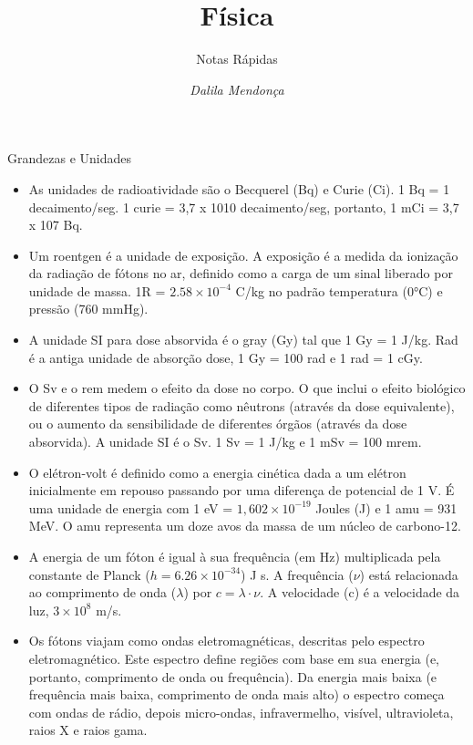 \documentclass[11pt,a4paper]{article}
\title{Física}
\author{Notas Rápidas\nocite{*}}
\date{\textit{Dalila Mendonça}}
\newcounter{exemplo}
\begin{document}
	\maketitle




\begin{exemplo}

    \textcolor{CarnationPink}{Grandezas e Unidades}

    \begin{itemize}
        \item As unidades de radioatividade são o Becquerel (Bq) e Curie (Ci). 1 Bq = 1 decaimento/seg. 1 curie = 3,7 x 1010 decaimento/seg, portanto, 1 mCi = 3,7 x 107 Bq.
        
        \item Um roentgen é a unidade de exposição. A exposição é a medida da ionização da radiação de fótons no ar, definido como a carga de um sinal liberado por unidade de massa. 1R = $2.58 \times 10^{-4}$ C/kg no padrão temperatura (\ang{0}C) e pressão (760 mmHg).
        
        \item A unidade SI para dose absorvida é o gray (Gy) tal que 1 Gy = 1 J/kg. Rad é a antiga unidade de absorção
        dose, 1 Gy = 100 rad e 1 rad = 1 cGy.

        \item O Sv e o rem medem o efeito da dose no corpo. O que inclui o efeito biológico de diferentes tipos
        de radiação como nêutrons (através da dose equivalente), ou o aumento da sensibilidade de diferentes órgãos (através da dose absorvida). A unidade SI é o Sv. 1 Sv = 1 J/kg e 1 mSv = 100 mrem.

        \item O elétron-volt é definido como a energia cinética dada a um elétron inicialmente em repouso passando por
        uma diferença de potencial de 1 V. É uma unidade de energia com 1 eV = $1,602 \times 10^{-19}$ Joules (J) e
        1 amu = 931 MeV. O amu representa um doze avos da massa de um núcleo de carbono-12.

        \item A energia de um fóton é igual à sua frequência (em Hz) multiplicada pela constante de Planck ($h = 6.26 \times 10^{-34} $) J s. A frequência ($\nu$) está relacionada ao comprimento de onda ($\lambda$) por  $c = \lambda \cdot \nu$. A velocidade (c) é a velocidade da luz, $3 \times 10^{8}$ m/s.
        
        \item Os fótons viajam como ondas eletromagnéticas, descritas pelo espectro eletromagnético. Este espectro
        define regiões com base em sua energia (e, portanto, comprimento de onda ou frequência). Da energia mais baixa
        (e frequência mais baixa, comprimento de onda mais alto) o espectro começa com ondas de rádio, depois micro-ondas,
        infravermelho, visível, ultravioleta, raios X e raios gama.


\end{itemize}
\end{exemplo}
\end{document}
